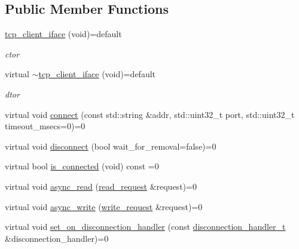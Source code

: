 \subsection*{Public Member Functions}
\begin{DoxyCompactItemize}
\item 
\hyperlink{classcpp__redis_1_1network_1_1tcp__client__iface_a8504873049519bcebd626984e4087a90}{tcp\+\_\+client\+\_\+iface} (void)=default
\begin{DoxyCompactList}\small\item\em ctor \end{DoxyCompactList}\item 
virtual \hyperlink{classcpp__redis_1_1network_1_1tcp__client__iface_a7381e8921118a13b5994101864906122}{$\sim$tcp\+\_\+client\+\_\+iface} (void)=default
\begin{DoxyCompactList}\small\item\em dtor \end{DoxyCompactList}\item 
virtual void \hyperlink{classcpp__redis_1_1network_1_1tcp__client__iface_a81ee982136e85b7c3401393341bc594c}{connect} (const std\+::string \&addr, std\+::uint32\+\_\+t port, std\+::uint32\+\_\+t timeout\+\_\+msecs=0)=0
\item 
virtual void \hyperlink{classcpp__redis_1_1network_1_1tcp__client__iface_a024073fb3436d8fa99de8cad63418f6c}{disconnect} (bool wait\+\_\+for\+\_\+removal=false)=0
\item 
virtual bool \hyperlink{classcpp__redis_1_1network_1_1tcp__client__iface_a41ad0b43e3ab172828a3d2ce55d23893}{is\+\_\+connected} (void) const =0
\item 
virtual void \hyperlink{classcpp__redis_1_1network_1_1tcp__client__iface_ae1f9fa87002273a0caf340407bb68ade}{async\+\_\+read} (\hyperlink{structcpp__redis_1_1network_1_1tcp__client__iface_1_1read__request}{read\+\_\+request} \&request)=0
\item 
virtual void \hyperlink{classcpp__redis_1_1network_1_1tcp__client__iface_a9cd01e8a68479456d15d6435ffad9b92}{async\+\_\+write} (\hyperlink{structcpp__redis_1_1network_1_1tcp__client__iface_1_1write__request}{write\+\_\+request} \&request)=0
\item 
virtual void \hyperlink{classcpp__redis_1_1network_1_1tcp__client__iface_acecf3b75c3849071d82478bc7a8c97a8}{set\+\_\+on\+\_\+disconnection\+\_\+handler} (const \hyperlink{classcpp__redis_1_1network_1_1tcp__client__iface_a9a7d5942205db8be03da581a848b8ec0}{disconnection\+\_\+handler\+\_\+t} \&disconnection\+\_\+handler)=0
\end{DoxyCompactItemize}


